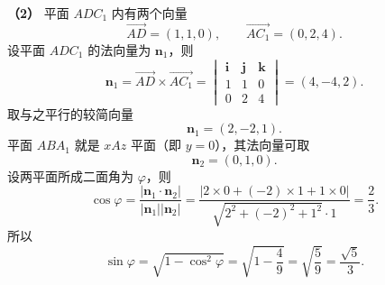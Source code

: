 \begin{answer}
\textbf{（2）} 平面 $ADC_1$ 内有两个向量
\nopagebreak[4]
\[\overrightarrow{AD}=(1,1,0),\qquad
\overrightarrow{AC_1}=(0,2,4).\]
设平面 $ADC_1$ 的法向量为 $\boldsymbol n_1$，则
\nopagebreak[4]
\[\boldsymbol n_1=\overrightarrow{AD}\times\overrightarrow{AC_1}
=\begin{vmatrix}
\boldsymbol i&\boldsymbol j&\boldsymbol k\\
1&1&0\\
0&2&4
\end{vmatrix}
=(4,-4,2).\]
取与之平行的较简向量
\nopagebreak[4]
\[\boldsymbol n_1=(2,-2,1).\]
平面 $ABA_1$ 就是 $xAz$ 平面（即 $y=0$），其法向量可取
\nopagebreak[4]
\[\boldsymbol n_2=(0,1,0).\]
设两平面所成二面角为 $\varphi$，则
\nopagebreak[4]
\[\cos\varphi
=\frac{|\boldsymbol n_1\cdot\boldsymbol n_2|}
{|\boldsymbol n_1||\boldsymbol n_2|}
=\frac{|2\times0+(-2)\times1+1\times0|}
{\sqrt{2^2+(-2)^2+1^2}\cdot1}
=\frac{2}{3}.\]
所以
\nopagebreak[4]
\[\sin\varphi=\sqrt{1-\cos^2\varphi}
=\sqrt{1-\frac49}
=\sqrt{\frac59}
=\frac{\sqrt5}{3}.\]



\end{answer}
